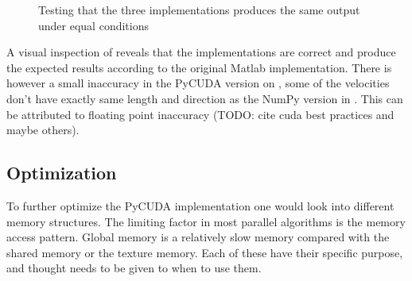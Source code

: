 \begin{figure}[H]
\centering
{}
\hspace{1pt}
\caption{Testing that the three implementations produces the same output under equal conditions}
\label{correctness}
\end{figure}

A visual inspection of  reveals that the implementations are correct and produce the expected results according to the original Matlab implementation. There is however a small inaccuracy in the PyCUDA version on , some of the velocities don't have exactly same length and direction as the NumPy version in . This can be attributed to floating point inaccuracy (TODO: cite cuda best practices and maybe others).



\subsection{Optimization}
To further optimize the PyCUDA implementation one would look into different memory structures. The limiting factor in most parallel algorithms is the memory access pattern. Global memory is a relatively slow memory compared with the shared memory or the texture memory. Each of these have their specific purpose, and thought needs to be given to when to use them.

